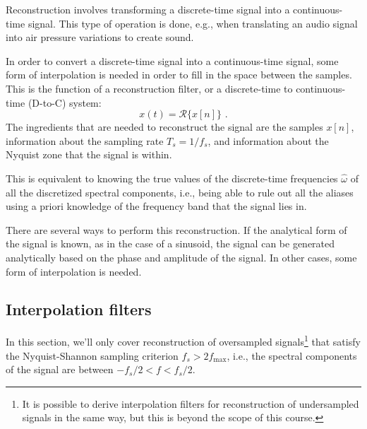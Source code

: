 Reconstruction involves transforming a discrete-time signal into a continuous-time signal. This type of operation is done, e.g., when 
translating an audio signal into air pressure variations to create sound.

In order to convert a discrete-time signal into a continuous-time signal, some form of interpolation is needed in 
order to fill in the space between the samples. This is the function of a reconstruction filter, or a discrete-time to continuous-time (D-to-C) system:
\begin{equation}
x(t) = \mathcal{R}\{x[n]\}\,\,.
\end{equation}
The ingredients that are needed to reconstruct the signal are the samples $x[n]$, information about the 
sampling rate $T_s=1/f_s$, and information about the Nyquist zone that the signal is within.

This is equivalent to knowing the true values of the discrete-time frequencies $\hat{\omega}$ of all the discretized spectral 
components, i.e., being able to rule out all the aliases using a priori knowledge of the frequency band that the signal lies in. 

There are several ways to perform this reconstruction. If the analytical form of the signal is known, as in the case of a sinusoid, 
the signal can be generated analytically based on the phase and amplitude of the signal. In other cases, some form of interpolation is needed.

\subsection{Interpolation filters}
In this section, we'll only cover reconstruction of oversampled signals\footnote{It is possible to derive interpolation filters 
for reconstruction of undersampled signals in the same way, but this is beyond the scope of this course.} that satisfy 
the Nyquist-Shannon sampling criterion $f_s > 2f_{\mathrm{max}}$, i.e., the spectral components of the signal are between $-f_s/2 < f < f_s/2$.

